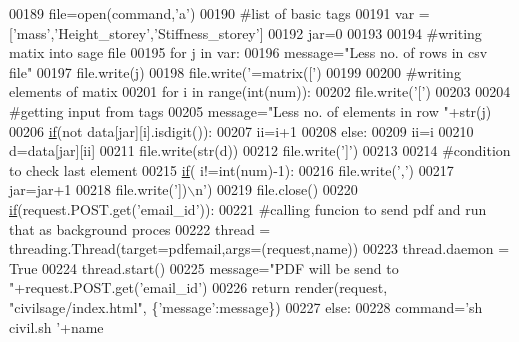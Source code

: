 \begin{DoxyCode}
00189         file=open(command,\textcolor{stringliteral}{'a'})
00190         \textcolor{comment}{#list of basic tags}
00191         var = [\textcolor{stringliteral}{'mass'},\textcolor{stringliteral}{'Height\_storey'},\textcolor{stringliteral}{'Stiffness\_storey'}]
00192         jar=0
00193 
00194         \textcolor{comment}{#writing matix into sage file}
00195         \textcolor{keywordflow}{for} j \textcolor{keywordflow}{in} var:
00196             message=\textcolor{stringliteral}{"Less no. of rows in csv file"}
00197             file.write(j)
00198             file.write(\textcolor{stringliteral}{'=matrix(['})
00199 
00200             \textcolor{comment}{#writing elements of matix}
00201             \textcolor{keywordflow}{for} i \textcolor{keywordflow}{in} range(int(num)):
00202                 file.write(\textcolor{stringliteral}{'['})
00203 
00204                 \textcolor{comment}{#getting input from tags}
00205                 message=\textcolor{stringliteral}{"Less no. of elements in row "}+str(j)
00206                 \hyperlink{bootstrap_8min_8js_ac2d69f5011896c6ed4a54e0dd36f6334}{if}(\textcolor{keywordflow}{not} data[jar][i].isdigit()):
00207                     ii=i+1
00208                 \textcolor{keywordflow}{else}:
00209                     ii=i
00210                 d=data[jar][ii]
00211                 file.write(str(d))
00212                 file.write(\textcolor{stringliteral}{']'})
00213 
00214                 \textcolor{comment}{#condition to check last element}
00215                 \hyperlink{bootstrap_8min_8js_ac2d69f5011896c6ed4a54e0dd36f6334}{if}( i!=int(num)-1):
00216                     file.write(\textcolor{stringliteral}{','})
00217             jar=jar+1
00218             file.write(\textcolor{stringliteral}{'])\(\backslash\)n'})
00219         file.close()
00220         \hyperlink{bootstrap_8min_8js_ac2d69f5011896c6ed4a54e0dd36f6334}{if}(request.POST.get(\textcolor{stringliteral}{'email\_id'})):
00221             \textcolor{comment}{#calling funcion to send pdf and run that as background proces}
00222             thread = threading.Thread(target=pdfemail,args=(request,name))
00223             thread.daemon = \textcolor{keyword}{True}
00224             thread.start()
00225             message=\textcolor{stringliteral}{"PDF will be send to "}+request.POST.get(\textcolor{stringliteral}{'email\_id'})
00226             \textcolor{keywordflow}{return} render(request, \textcolor{stringliteral}{"civilsage/index.html"}, \{\textcolor{stringliteral}{'message'}:message\})
00227         \textcolor{keywordflow}{else}:
00228             command=\textcolor{stringliteral}{'sh  civil.sh '}+name

\end{DoxyCode}
